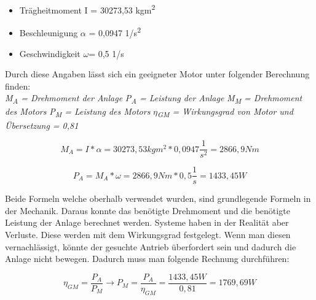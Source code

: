 \begin{itemize}
	\item{Trägheitmoment I = 30273,53 kgm\textsuperscript{2}}
	\item{Beschleunigung $\alpha$ = 0,0947 1/s\textsuperscript{2}}
	\item{Geschwindigkeit $\omega$= 0,5 1/s}
\end{itemize}

Durch diese Angaben lässt sich ein geeigneter Motor unter folgender Berechnung finden:
\\
\textit{M\textsubscript{A} = Drehmoment der Anlage} \newline
\textit{P\textsubscript{A} = Leistung der Anlage} \newline
\textit{M\textsubscript{M} = Drehmoment des Motors} \newline
\textit{P\textsubscript{M} = Leistung des Motors} \newline
\textit{$\eta$\textsubscript{GM} = Wirkungsgrad von Motor und Übersetzung = 0,81}


\begin{center}
\begin{equation}
  \label{eq:2}
	M_{A} = I * \alpha = 30273,53kgm^2 * 0,0947 \dfrac{1}{s^2} = 2866,9 Nm
\end{equation} 
\end{center}


 
\begin{center}
\begin{equation}
  \label{eq:3}
	P_{A} = M_{A} * \omega = 2866,9 Nm * 0,5 \dfrac{1}{s} = 1433,45W
\end{equation} 
\end{center}

Beide Formeln welche oberhalb verwendet wurden, sind grundlegende Formeln in der Mechanik. Daraus konnte das benötigte Drehmoment und die benötigte Leistung der Anlage berechnet werden. Systeme haben in der Realität aber Verluste. Diese werden mit dem Wirkungsgrad festgelegt. Wenn man diesen vernachlässigt, könnte der gesuchte Antrieb überfordert sein und dadurch die Anlage nicht bewegen. Dadurch muss man folgende Rechnung durchführen:

\begin{center}
\begin{equation}
  \label{eq:4}
	\eta_{GM}= \frac{P_{A}}{P_{M}} \rightarrow P_{M} = \frac{P_{A}}{\eta_{GM}} = \frac{1433,45W}{0,81} = 1769,69W
\end{equation} 
\end{center}

